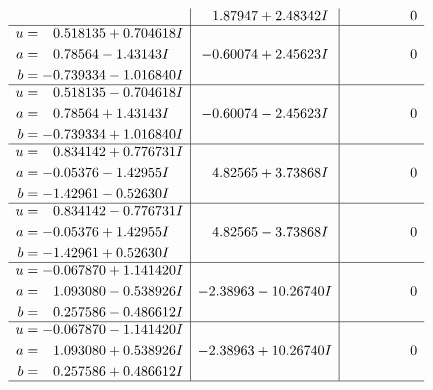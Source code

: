 \documentclass[1p]{elsarticle_modified}
\theoremstyle{definition}
\begin{document}
$$\begin{array}{c|c|c}
 & \phantom{-}1.87947 + 2.48342 I & \phantom{-0.000000 } 0 \\ \hline\begin{aligned}
u &= \phantom{-}0.518135 + 0.704618 I \\
a &= \phantom{-}0.78564 - 1.43143 I \\
b &= -0.739334 - 1.016840 I\end{aligned}
 & -0.60074 + 2.45623 I & \phantom{-0.000000 } 0 \\ \hline\begin{aligned}
u &= \phantom{-}0.518135 - 0.704618 I \\
a &= \phantom{-}0.78564 + 1.43143 I \\
b &= -0.739334 + 1.016840 I\end{aligned}
 & -0.60074 - 2.45623 I & \phantom{-0.000000 } 0 \\ \hline\begin{aligned}
u &= \phantom{-}0.834142 + 0.776731 I \\
a &= -0.05376 - 1.42955 I \\
b &= -1.42961 - 0.52630 I\end{aligned}
 & \phantom{-}4.82565 + 3.73868 I & \phantom{-0.000000 } 0 \\ \hline\begin{aligned}
u &= \phantom{-}0.834142 - 0.776731 I \\
a &= -0.05376 + 1.42955 I \\
b &= -1.42961 + 0.52630 I\end{aligned}
 & \phantom{-}4.82565 - 3.73868 I & \phantom{-0.000000 } 0 \\ \hline\begin{aligned}
u &= -0.067870 + 1.141420 I \\
a &= \phantom{-}1.093080 - 0.538926 I \\
b &= \phantom{-}0.257586 - 0.486612 I\end{aligned}
 & -2.38963 - 10.26740 I & \phantom{-0.000000 } 0 \\ \hline\begin{aligned}
u &= -0.067870 - 1.141420 I \\
a &= \phantom{-}1.093080 + 0.538926 I \\
b &= \phantom{-}0.257586 + 0.486612 I\end{aligned}
 & -2.38963 + 10.26740 I & \phantom{-0.000000 } 0\\
 \hline 
 \end{array}$$\newpage$$\begin{array}{c|c|c}  

\end{array}$$
\end{document}
